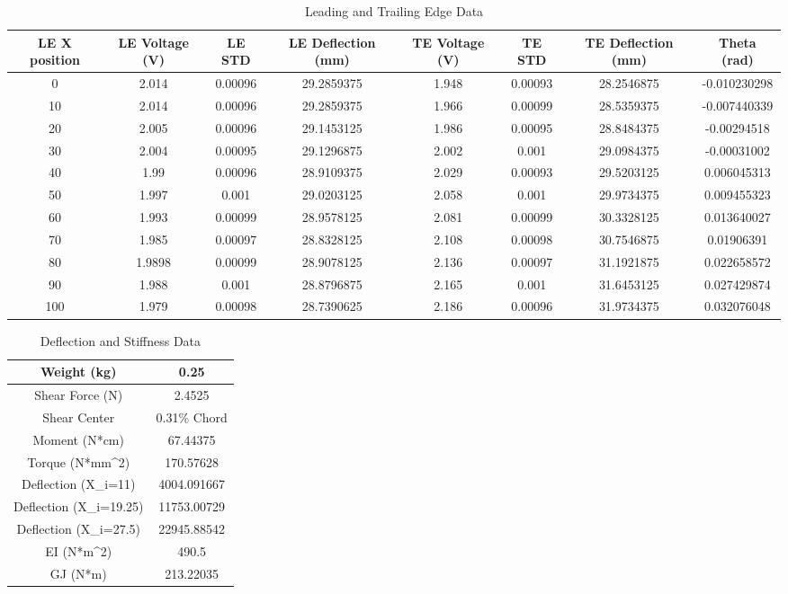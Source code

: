 \documentclass{article}
\begin{document}
\begin{table}[hbtp]
  \centering
  \begin{tabular}{cccccccc}
  \hline
  LE X position & LE Voltage (V) & LE STD & LE Deflection (mm) & TE Voltage (V) & TE STD & TE Deflection (mm) & Theta (rad) \\
  \hline
  0 & 2.014 & 0.00096 & 29.2859375 & 1.948 & 0.00093 & 28.2546875 & -0.010230298 \\
  10 & 2.014 & 0.00096 & 29.2859375 & 1.966 & 0.00099 & 28.5359375 & -0.007440339 \\
  20 & 2.005 & 0.00096 & 29.1453125 & 1.986 & 0.00095 & 28.8484375 & -0.00294518 \\
  30 & 2.004 & 0.00095 & 29.1296875 & 2.002 & 0.001 & 29.0984375 & -0.00031002 \\
  40 & 1.99 & 0.00096 & 28.9109375 & 2.029 & 0.00093 & 29.5203125 & 0.006045313 \\
  50 & 1.997 & 0.001 & 29.0203125 & 2.058 & 0.001 & 29.9734375 & 0.009455323 \\
  60 & 1.993 & 0.00099 & 28.9578125 & 2.081 & 0.00099 & 30.3328125 & 0.013640027 \\
  70 & 1.985 & 0.00097 & 28.8328125 & 2.108 & 0.00098 & 30.7546875 & 0.01906391 \\
  80 & 1.9898 & 0.00099 & 28.9078125 & 2.136 & 0.00097 & 31.1921875 & 0.022658572 \\
  90 & 1.988 & 0.001 & 28.8796875 & 2.165 & 0.001 & 31.6453125 & 0.027429874 \\
  100 & 1.979 & 0.00098 & 28.7390625 & 2.186 & 0.00096 & 31.9734375 & 0.032076048 \\
  \hline
  \end{tabular}
  \caption{Leading and Trailing Edge Data}
  \label{tab:LE_TE_Data}
\end{table}
  
\begin{table}[hbtp]
  \centering
  \begin{tabular}{|c|c|}
  \hline
  Weight (kg) & 0.25 \\
  \hline
  Shear Force (N) & 2.4525 \\
  \hline
  Shear Center & 0.31\% Chord \\
  \hline
  Moment (N*cm) & 67.44375 \\
  \hline
  Torque (N*mm^2) & 170.57628 \\
  \hline
  Deflection (X_i=11) & 4004.091667 \\
  \hline
  Deflection (X_i=19.25) & 11753.00729 \\
  \hline
  Deflection (X_i=27.5) & 22945.88542 \\
  \hline
  EI (N*m^2) & 490.5 \\
  \hline
  GJ (N*m) & 213.22035 \\
  \hline
  \end{tabular}
  \caption{Deflection and Stiffness Data}
  \label{tab:deflect_stiff}
\end{table}
\end{document}
